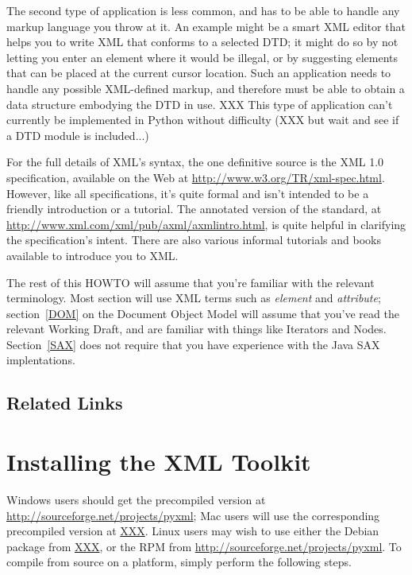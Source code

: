 \documentclass{howto}
\begin{document}
The second type of application is less common, and has to be able to
handle any markup language you throw at it.  An example might be a
smart XML editor that helps you to write XML that conforms to a
selected DTD; it might do so by not letting you enter an element where
it would be illegal, or by suggesting elements that can be placed at
the current cursor location.  Such an application needs to handle any
possible XML-defined markup, and therefore must be able to obtain a
data structure embodying the DTD in use.  XXX This type of application
can't currently be implemented in Python without difficulty (XXX but
wait and see if a DTD module is included...)

For the full details of XML's syntax, the one definitive source is the
XML 1.0 specification, available on the Web at
\url{http://www.w3.org/TR/xml-spec.html}.  However, like all
specifications, it's quite formal and isn't intended to be a friendly
introduction or a tutorial.  The annotated version of the standard, at
\url{http://www.xml.com/xml/pub/axml/axmlintro.html}, is quite helpful
in clarifying the specification's intent.  There are also various
informal tutorials and books available to introduce you to XML.

The rest of this HOWTO will assume that you're familiar with the
relevant terminology.  Most section will use XML terms such as
\emph{element} and \emph{attribute}; section~\ref{DOM} on the Document
Object Model will assume that you've read the relevant Working Draft,
and are familiar with things like Iterators and Nodes.
Section~\ref{SAX} does not require that you have experience with the
Java SAX implentations.

\subsection{Related Links}

\section{Installing the XML Toolkit}

Windows users should get the precompiled version at
\url{http://sourceforge.net/projects/pyxml}; Mac users will use the
corresponding precompiled version at \url{XXX}.  Linux users may wish
to use either the Debian package from \url{XXX}, or the RPM from
\url{http://sourceforge.net/projects/pyxml}.  To compile from source
on a \UNIX{} platform, simply perform the following steps.
\end{document}
